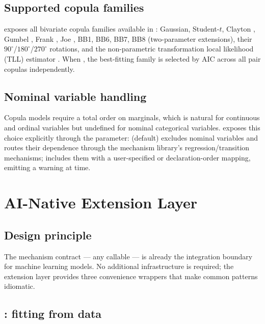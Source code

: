 \documentclass[article]{jss}
\begin{document}
\subsection{Supported copula families}

 exposes all bivariate copula families available in  \citep{nagler2021rvinecopulib}: Gaussian, Student-$t$, Clayton \citep{clayton1978model}, Gumbel \citep{gumbel1960bivariate}, Frank \citep{frank1979}, Joe \citep{joe1993}, BB1, BB6, BB7, BB8 (two-parameter extensions), their $90^\circ$/$180^\circ$/$270^\circ$ rotations, and the non-parametric transformation local likelihood (TLL) estimator \citep{nagler2016evading}. When , the best-fitting family is selected by AIC across all pair copulas independently.

\subsection{Nominal variable handling}

Copula models require a total order on marginals, which is natural for continuous and ordinal variables but undefined for nominal categorical variables.  exposes this choice explicitly through the  parameter:  (default) excludes nominal variables and routes their dependence through the mechanism library's regression/transition mechanisms;  includes them with a user-specified or declaration-order mapping, emitting a warning at  time.

\section{AI-Native Extension Layer}
\label{sec:ai}

\subsection{Design principle}

The mechanism contract --- any callable  --- is already the integration boundary for machine learning models. No additional infrastructure is required; the extension layer provides three convenience wrappers that make common patterns idiomatic.

\subsection{: fitting from data}
\end{document}
